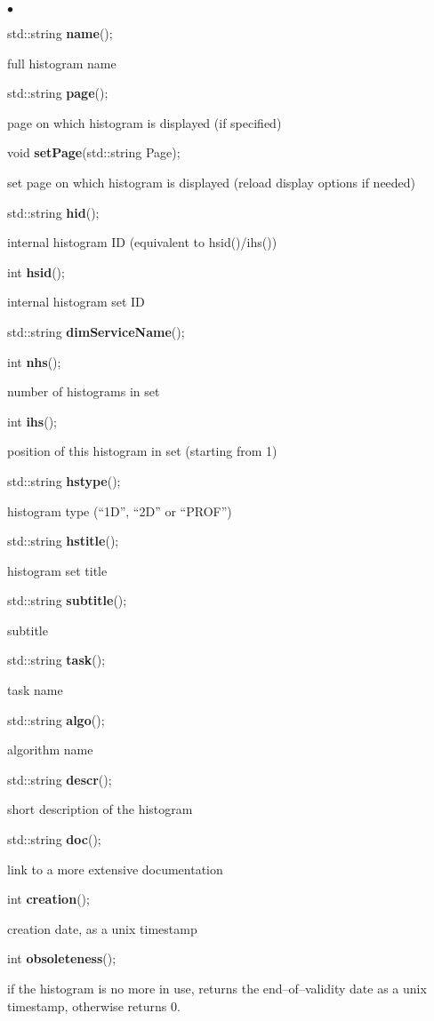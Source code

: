 \documentclass{lhcbnote}
\begin{document}
\begin{list}{$\bullet$}{}
\item   std::string {\bf name}();

full histogram name
\item   std::string {\bf page}();

page on which histogram is displayed (if specified)
\item void {\bf setPage}(std::string Page);

set page on which histogram is displayed (reload display options if needed)


\item   std::string {\bf hid}();

internal histogram ID (equivalent to hsid()/ihs())
\item   int {\bf hsid}();

internal histogram set ID
\item   std::string {\bf dimServiceName}();
\item   int {\bf nhs}();

number of histograms in set
\item   int {\bf ihs}();

position of this histogram in set (starting from 1)
\item   std::string {\bf  hstype}();

histogram type (``1D'', ``2D'' or ``PROF'')
\item   std::string {\bf hstitle}();

histogram set title
\item   std::string {\bf subtitle}();

subtitle 
\item   std::string {\bf task}();

task name
\item   std::string {\bf algo}();

algorithm name

\item   std::string {\bf descr}();

short description of the histogram
\item   std::string {\bf doc}();

link to a more extensive documentation

\item   int {\bf creation}();

creation date, as a unix timestamp
\item   int {\bf obsoleteness}();

if the histogram is no more in use, returns the end--of--validity date
as a unix timestamp, otherwise returns 0. 
\end{list}
\end{document}
